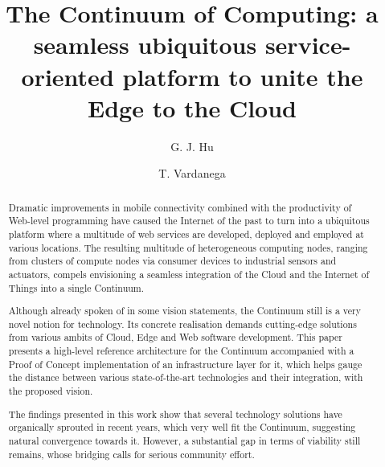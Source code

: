 \documentclass{elsarticle}
\begin{document}
\begin{frontmatter}


\title{The Continuum of Computing: a seamless ubiquitous service-oriented platform to unite the Edge to the Cloud}

\author[1]{G. J. Hu}
\author[1]{T. Vardanega}
\address[1]{Department of Mathematics, University of Padova, Italy}

\begin{abstract}
Dramatic improvements in mobile connectivity combined with the productivity of Web-level programming have caused the Internet of the past to turn into a ubiquitous platform where a multitude of web services are developed, deployed and employed at various locations. The resulting multitude of heterogeneous computing nodes, ranging from clusters of compute nodes via consumer devices to industrial sensors and actuators, compels envisioning a seamless integration of the Cloud and the Internet of Things into a single Continuum.\par
Although already spoken of in some vision statements, the Continuum still is a very novel notion for technology. Its concrete realisation demands cutting-edge solutions from various ambits of Cloud, Edge and Web software development. This paper presents a high-level reference architecture for the Continuum accompanied with a Proof of Concept implementation of an infrastructure layer for it, which helps gauge the distance between various state-of-the-art technologies and their integration, with the proposed vision.\par
The findings presented in this work show that several technology solutions have organically sprouted in recent years, which very well fit the Continuum, suggesting natural convergence towards it. However, a substantial gap in terms of viability still remains, whose bridging calls for serious community effort.
\end{abstract}




\end{frontmatter}
\end{document}
